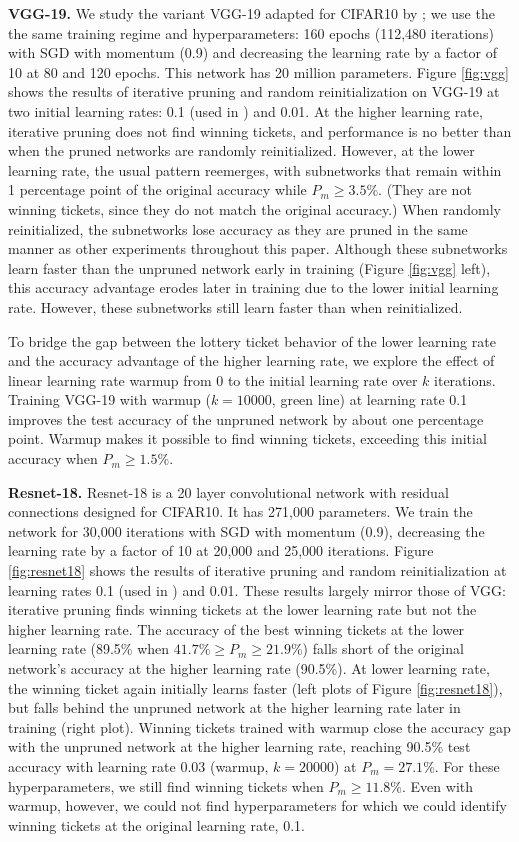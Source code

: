 \textbf{VGG-19.} We study the variant VGG-19 adapted for CIFAR10 by \citet{rethinking-pruning};
we use the the same training regime and
hyperparameters: 160 epochs (112,480 iterations)
with SGD with momentum (0.9) and decreasing the learning rate by a factor of 10 at 80 and 120 epochs.
This network has 20 million parameters. 
Figure \ref{fig:vgg} shows the results of iterative
pruning and random reinitialization on VGG-19 at two initial learning rates: 0.1 (used in \citet{rethinking-pruning}) and 0.01.
At the higher learning rate, iterative pruning does not find winning tickets, and performance
is no better than when the pruned networks are randomly reinitialized.
However, at the lower learning rate, the usual pattern reemerges, with
subnetworks that remain within 1 percentage point of the original accuracy while $P_m \geq 3.5\%$.
(They are not winning tickets, since they do not match the original accuracy.)
When randomly reinitialized, the subnetworks lose accuracy as they are pruned in the same manner as other experiments throughout this paper.
Although these subnetworks learn faster than the unpruned network early in training (Figure \ref{fig:vgg} left),
this accuracy advantage erodes later in training due to the lower initial learning rate. However, these
subnetworks still learn faster than when reinitialized.

To bridge the gap between the lottery ticket behavior of the lower learning rate and the accuracy advantage of the higher learning rate,
we explore the effect of linear learning rate warmup from 0 to the initial learning rate over $k$ iterations.
Training VGG-19 with warmup ($k=10000$, green line) at learning rate 0.1 improves the test accuracy of the unpruned network by about one percentage point.
Warmup makes it possible to find winning tickets, exceeding this initial accuracy when $P_m \geq 1.5\%$.

\textbf{Resnet-18.} Resnet-18 \citep{resnet} is a 20 layer convolutional network with residual connections designed for CIFAR10.
It has 271,000 parameters. We train the network for 30,000 iterations with SGD with momentum (0.9), decreasing
the learning rate by a factor of 10 at 20,000 and 25,000 iterations. Figure \ref{fig:resnet18} shows the results
of iterative pruning and random reinitialization at learning rates 0.1 (used in \citet{resnet}) and 0.01. These results largely mirror those of VGG:
iterative pruning finds winning tickets at the lower learning rate but not the higher learning rate.
The accuracy of the best winning tickets at the lower learning rate (89.5\% when $41.7\% \geq P_m \geq 21.9\%$) falls short of the original network's accuracy at the higher learning rate (90.5\%).
At lower learning rate, the winning ticket again initially learns faster (left plots of Figure \ref{fig:resnet18}), but falls behind the unpruned network
at the higher learning rate later in training (right plot).
Winning tickets trained with warmup close the accuracy gap with the unpruned network at the higher learning rate,
reaching 90.5\% test accuracy with learning rate 0.03 (warmup, $k=20000$) at $P_m = 27.1\%$. For these hyperparameters, we still
find winning tickets when $P_m \geq 11.8\%$. Even with warmup, however, we could not find hyperparameters for which
we could identify winning tickets at the original learning rate, 0.1.